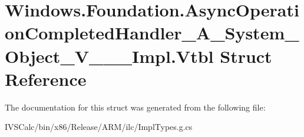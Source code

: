 \hypertarget{struct_windows_1_1_foundation_1_1_async_operation_completed_handler___a___system___object___v_______impl_1_1_vtbl}{}\section{Windows.\+Foundation.\+Async\+Operation\+Completed\+Handler\+\_\+\+A\+\_\+\+System\+\_\+\+Object\+\_\+\+V\+\_\+\+\_\+\+\_\+\+Impl.\+Vtbl Struct Reference}
\label{struct_windows_1_1_foundation_1_1_async_operation_completed_handler___a___system___object___v_______impl_1_1_vtbl}


The documentation for this struct was generated from the following file\+:\begin{DoxyCompactItemize}
\item 
I\+V\+S\+Calc/bin/x86/\+Release/\+A\+R\+M/ilc/Impl\+Types.\+g.\+cs\end{DoxyCompactItemize}
